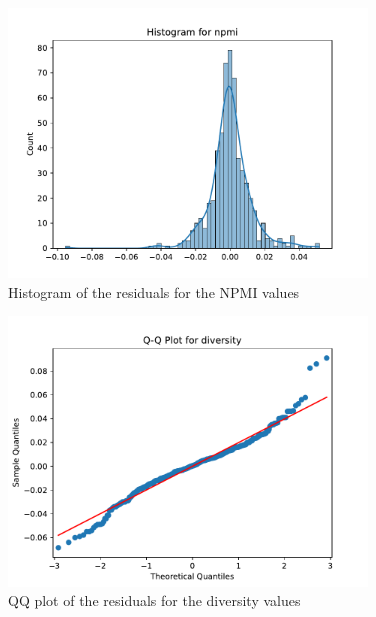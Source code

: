 \begin{figure}[h]
    \centering
    \includegraphics[width=0.85\textwidth]{figures/histogram_npmi.pdf}
    \caption{Histogram of the residuals for the NPMI values}
    \label{fig:histogram_npmi}
\end{figure}

\begin{figure}[h]
    \centering
    \includegraphics[width=0.85\textwidth]{figures/qqplot_diversity.pdf}
    \caption{Q\-Q plot of the residuals for the diversity values}
    \label{fig:qqplot_diversity}
\end{figure}

